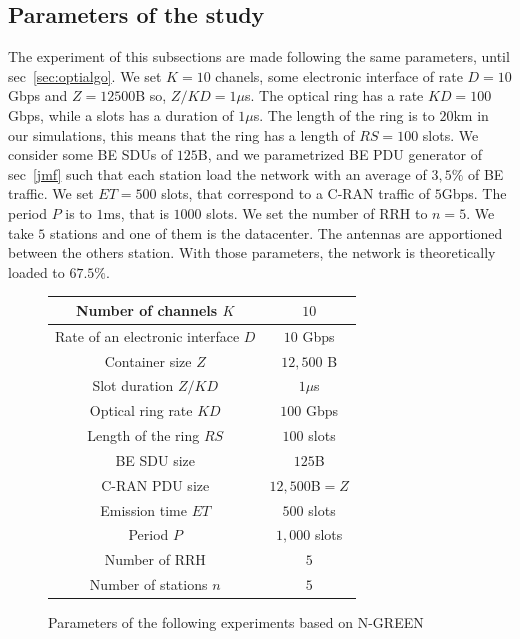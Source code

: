 \documentclass[]{algotel}
\begin{document}
  \subsection{Parameters of the study}
  \label{sec:parameters} The experiment of this subsections are made following the same parameters, until sec~\ref{sec:optialgo}. We set $K = 10$ chanels, some electronic interface of rate $D=10$Gbps and $Z = 12500$B so, $Z/KD = 1\mu$s. The optical ring has a rate $KD=100$Gbps, while a slots has a duration of $1\mu$s. The length of the ring is to $20$km in our simulations, this means that the ring has a length of $RS = 100$ slots. We consider some BE SDUs of $125$B, and we parametrized BE PDU generator of sec~\ref{jmf} such that each station load the network with an average of $3,5\%$ of BE traffic. We set $ET = 500$ slots, that correspond to a C-RAN traffic of $5$Gbps. The period  $P$ is to $1$ms, that is $1000$ slots. We set the number of RRH to $n=5$. We take $5$ stations and one of them is the datacenter. The antennas are apportioned between the others station. With those parameters, the network is theoretically loaded to $67.5\%$. 
  
  \begin{figure}
  \centering
  \begin{tabular}{|c|c|}
  \hline
 Number of channels $K$ & $10$  \tabularnewline
  \hline
  Rate of an electronic interface $D$ & $10$ Gbps \tabularnewline
  \hline
  Container size  $Z$ & $12,500$ B  \tabularnewline
  \hline
  Slot duration $Z/KD$ & $1\mu$s \tabularnewline
  \hline
  Optical ring rate $KD$ & $100$ Gbps \tabularnewline
  \hline
  Length of the ring $RS$ & $100$ slots \tabularnewline
  \hline
  BE SDU size & $125$B \tabularnewline
  \hline
  C-RAN PDU size & $12,500$B$=Z$ \tabularnewline
  \hline
  Emission time $ET$ & $500$ slots \tabularnewline
  \hline
   Period $P$ & $1,000$ slots \tabularnewline
  \hline
  Number of RRH & $5$  \tabularnewline
  \hline
  Number of stations $n$ & $5$  \tabularnewline
  \hline
  
  \end{tabular}
  \caption{Parameters of the following experiments based on N-GREEN}\label{parameters}
  \end{figure}
  
\end{document}

